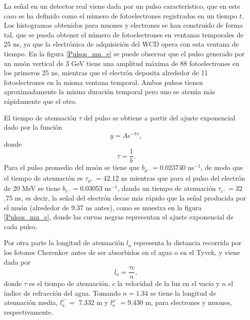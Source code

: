 \documentclass[12pt,oneside,openany,letter]{book}
\begin{document}
La señal en un detector real viene dada por un pulso característico, que en este caso se ha definido como el número de fotoelectrones registrados en un tiempo $t$. Los histogramas obtenidos para muones y electrones se han construido de forma tal, que se pueda obtener el número de fotoelectrones en ventanas temporales de 25 ns, ya que la electr\'onica de adquisici\'on del WCD opera con esta ventana de tiempo. En la figura \ref{Pulsos_mu_e} se puede observar que el pulso generado por un muón vertical de 3 GeV tiene una amplitud máxima de 88 fotoelectrones en los primeros 25 ns, mientras que el electrón deposita alrededor de 11 fotoelectrones en la misma ventana temporal. Ambos pulsos tienen aproximadamente la misma duración temporal pero uno se atenúa más rápidamente que el otro.

El tiempo de atenuación $\tau$ del pulso se obtiene a partir del ajuste exponencial dado por la función
\begin{equation}
y = A e^{-b\, t },
\end{equation}
donde 
\begin{equation}
\tau = \frac{1}{b}.
\end{equation}
Para el pulso promedio del muón se tiene que $b_{\mu^-}=0$.023740 ns$^{-1}$, de modo que el tiempo de atenuación es $\tau_{\mu^-}=42$.12 ns mientras que para el pulso del electrón de 20 MeV se tiene $b_{e^-}=0$.03053 ns$^{-1}$, dando un tiempo de atenuación $\tau_{e^-}=32$.75 ns, es decir, la señal del electrón decae más rápido que la señal producida por el muón (alrededor de 9.37 ns antes), como se muestra en la figura \ref{Pulsos_mu_e}, donde las curvas negras representan el ajuste exponencial de cada pulso.

Por otra parte la longitud de atenuación $l_a$ representa la distancia recorrida por los fotones Cherenkov antes de ser absorbidos en el agua o en el Tyvek, y viene dada por
\begin{equation}
l_a = \frac{\tau c}{n},
\end{equation}
donde $\tau$ es el tiempo de atenuación, $c$ la velocidad de la luz en el vacío y $n$ el índice de refracción del agua. Tomando $n=1$.34 se tiene la longitud de atenuación media, $l^{e^-}_a =$ 7.332 m y $l^{\mu^-}_a =$9.430 m, para electrones y muones, respectivamente.
\end{document}
